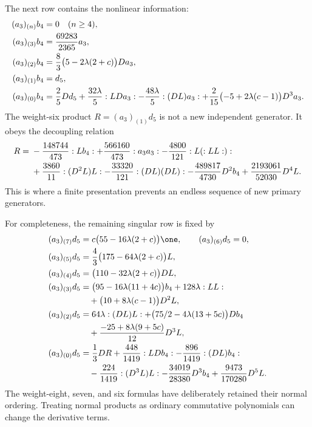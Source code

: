 The next row contains the nonlinear information:
\begin{align}
 (a_3)_{(n)}b_4&=0\quad(n\geq4),\notag\\
 (a_3)_{(3)}b_4&=\frac{69283}{2365}a_3,\notag\\
 (a_3)_{(2)}b_4&=\frac83\bigl(5-2\lambda(2+c)\bigr)Da_3,
 \label{eq:c-pf-second}\\
 (a_3)_{(1)}b_4&=d_5,\notag\\
 (a_3)_{(0)}b_4&=\frac25Dd_5+\frac{32\lambda}{5}:LDa_3:
 -\frac{48\lambda}{5}:(DL)a_3:
 +\frac2{15}\bigl(-5+2\lambda(c-1)\bigr)D^3a_3.\notag
\end{align}
The weight-six product $R=(a_3)_{(1)}d_5$ is not a new independent
generator. It obeys the decoupling relation
\begin{align}\label{eq:c-pf-decoupling}
 R={}&-\frac{148744}{473}:Lb_4:
 +\frac{566160}{473}:a_3a_3:
 -\frac{4800}{121}:L(:LL:):\notag\\
 &+\frac{3860}{11}:(D^2L)L:
 -\frac{33320}{121}:(DL)(DL):
 -\frac{489817}{4730}D^2b_4
 +\frac{2193061}{52030}D^4L.
\end{align}
This is where a finite presentation prevents an endless sequence of
new primary generators.

For completeness, the remaining singular row is fixed by
\begin{align*}
 (a_3)_{(7)}d_5&=c\bigl(55-16\lambda(2+c)\bigr)\one,
 \qquad (a_3)_{(6)}d_5=0,\\
 (a_3)_{(5)}d_5&=\frac43\bigl(175-64\lambda(2+c)\bigr)L,
 \\
 (a_3)_{(4)}d_5&=\bigl(110-32\lambda(2+c)\bigr)DL,\\
 (a_3)_{(3)}d_5&=\bigl(95-16\lambda(11+4c)\bigr)b_4
             +128\lambda:LL:\\
 &\quad+\bigl(10+8\lambda(c-1)\bigr)D^2L,\\
 (a_3)_{(2)}d_5&=64\lambda:(DL)L:
       +\bigl(75/2-4\lambda(13+5c)\bigr)Db_4\\
 &\quad+\frac{-25+8\lambda(9+5c)}{12}D^3L,\\
 (a_3)_{(0)}d_5&=\frac13DR+\frac{448}{1419}:LDb_4:
       -\frac{896}{1419}:(DL)b_4:\\
 &\quad-\frac{224}{1419}:(D^3L)L:
       -\frac{34019}{28380}D^3b_4
                      +\frac{9473}{170280}D^5L.
\end{align*}
The weight-eight, seven, and six formulas have deliberately retained
their normal ordering. Treating normal products as ordinary commutative
polynomials can change the derivative terms.

